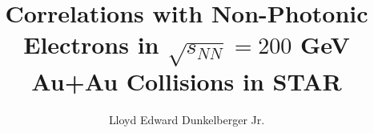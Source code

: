 \documentclass[double, PhD]{uclathes}
\title{Correlations with Non-Photonic Electrons in $\sqrt{s_{NN}} = 200$ GeV Au+Au Collisions in STAR}
\author{Lloyd Edward Dunkelberger Jr.}
\begin{document}
\makeintropages







\appendix
\label{Appendix}


\end{document}
